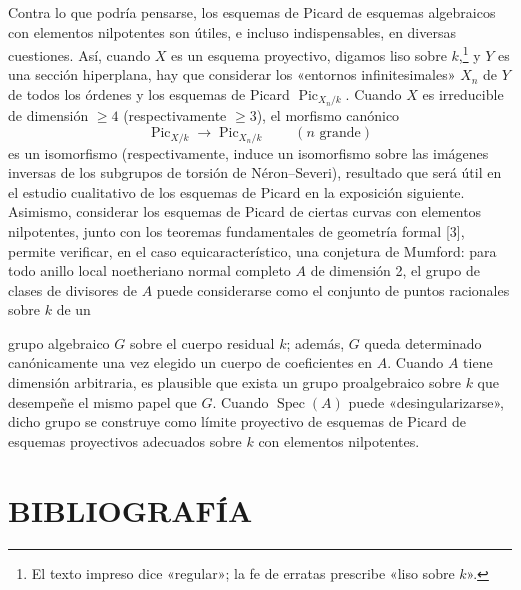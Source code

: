  Contra lo que podría pensarse, los esquemas de Picard
de esquemas algebraicos con elementos nilpotentes son útiles, e incluso
indispensables, en diversas cuestiones. Así, cuando $X$ es un esquema
proyectivo, digamos liso sobre $k$,\footnote{El texto impreso dice «regular»; la
fe de erratas prescribe «liso sobre $k$».} y $Y$ es una sección hiperplana, hay que
considerar los «entornos infinitesimales» $X_n$ de $Y$ de todos los órdenes y
los esquemas de Picard $\operatorname{Pic}_{X_n/k}$. Cuando $X$ es irreducible
de dimensión $\geq4$ (respectivamente $\geq3$), el morfismo canónico
\[
\operatorname{Pic}_{X/k}\longrightarrow\operatorname{Pic}_{X_n/k}
\qquad(n\text{ grande})
\]
es un isomorfismo (respectivamente, induce un isomorfismo sobre las imágenes
inversas de los subgrupos de torsión de Néron--Severi), resultado que será útil
en el estudio cualitativo de los esquemas de Picard en la exposición siguiente.
Asimismo, considerar los esquemas de Picard de ciertas curvas con elementos
nilpotentes, junto con los teoremas fundamentales de geometría formal [3],
permite verificar, en el caso equicaracterístico, una conjetura de Mumford:
para todo anillo local noetheriano normal completo $A$ de dimensión 2, el grupo
de clases de divisores de $A$ puede considerarse como el conjunto de puntos
racionales sobre $k$ de un

grupo algebraico $G$ sobre el cuerpo residual $k$; además, $G$ queda
determinado canónicamente una vez elegido un cuerpo de coeficientes en $A$.
Cuando $A$ tiene dimensión arbitraria, es plausible que exista un grupo
proalgebraico sobre $k$ que desempeñe el mismo papel que $G$. Cuando
$\operatorname{Spec}(A)$ puede «desingularizarse», dicho grupo se construye como
límite proyectivo de esquemas de Picard de esquemas proyectivos adecuados sobre
$k$ con elementos nilpotentes.

\section*{BIBLIOGRAFÍA}

